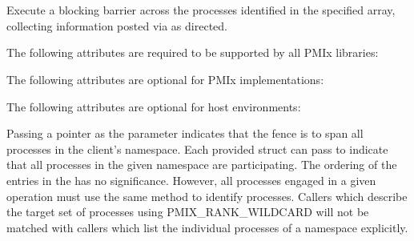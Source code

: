 \section{}

\summary

Execute a blocking barrier across the processes identified in the specified array, collecting information posted via  as directed.

\format


\begin{arglist}
\end{arglist}

\returnsimple

\reqattrstart
The following attributes are required to be supported by all \ac{PMIx} libraries:


\reqattrend

\optattrstart
The following attributes are optional for \ac{PMIx} implementations:



The following attributes are optional for host environments:


\optattrend

\descr

Passing a  pointer as the  parameter indicates that the fence is to span all processes in the client's namespace.
Each provided  struct can pass  to indicate that all processes in the given namespace are participating.
The ordering of the entries in the  has no significance.  However, all processes engaged in a given 
operation must use the same method to identify processes.  Callers which describe
the target set of processes using PMIX_RANK_WILDCARD will not be matched with 
callers which list the individual processes of a namespace explicitly.

